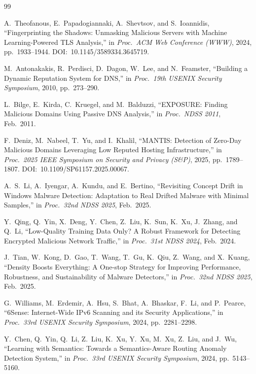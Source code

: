 \documentclass[12pt, a4paper, twoside]{report}
\begin{document}
\cleardoublepage
{}

\begin{thebibliography}{99}

A.~Theofanous, E.~Papadogiannaki, A.~Shevtsov, and S.~Ioannidis,
``Fingerprinting the Shadows: Unmasking Malicious Servers with Machine Learning-Powered TLS Analysis,''
in \textit{Proc.\ ACM Web Conference (WWW)}, 2024, pp.\ 1933--1944.
DOI:~10.1145/3589334.3645719.

M.~Antonakakis, R.~Perdisci, D.~Dagon, W.~Lee, and N.~Feamster,
``Building a Dynamic Reputation System for DNS,''
in \textit{Proc.\ 19th USENIX Security Symposium}, 2010, pp.\ 273--290.

L.~Bilge, E.~Kirda, C.~Kruegel, and M.~Balduzzi,
``EXPOSURE: Finding Malicious Domains Using Passive DNS Analysis,''
in \textit{Proc.\ NDSS 2011}, Feb.\ 2011.

F.~Deniz, M.~Nabeel, T.~Yu, and I.~Khalil,
``MANTIS: Detection of Zero-Day Malicious Domains Leveraging Low Reputed Hosting Infrastructure,''
in \textit{Proc.\ 2025 IEEE Symposium on Security and Privacy (S\&P)}, 2025, pp.\ 1789--1807.
DOI:~10.1109/SP61157.2025.00067.

A.~S.~Li, A.~Iyengar, A.~Kundu, and E.~Bertino,
``Revisiting Concept Drift in Windows Malware Detection: Adaptation to Real Drifted Malware with Minimal Samples,''
in \textit{Proc.\ 32nd NDSS 2025}, Feb.\ 2025.

Y.~Qing, Q.~Yin, X.~Deng, Y.~Chen, Z.~Liu, K.~Sun, K.~Xu, J.~Zhang, and Q.~Li,
``Low-Quality Training Data Only? A Robust Framework for Detecting Encrypted Malicious Network Traffic,''
in \textit{Proc.\ 31st NDSS 2024}, Feb.\ 2024.

J.~Tian, W.~Kong, D.~Gao, T.~Wang, T.~Gu, K.~Qiu, Z.~Wang, and X.~Kuang,
``Density Boosts Everything: A One-stop Strategy for Improving Performance, Robustness, and Sustainability of Malware Detectors,''
in \textit{Proc.\ 32nd NDSS 2025}, Feb.\ 2025.

G.~Williams, M.~Erdemir, A.~Hsu, S.~Bhat, A.~Bhaskar, F.~Li, and P.~Pearce,
``6Sense: Internet-Wide IPv6 Scanning and its Security Applications,''
in \textit{Proc.\ 33rd USENIX Security Symposium}, 2024, pp.\ 2281--2298.

Y.~Chen, Q.~Yin, Q.~Li, Z.~Liu, K.~Xu, Y.~Xu, M.~Xu, Z.~Liu, and J.~Wu,
``Learning with Semantics: Towards a Semantics-Aware Routing Anomaly Detection System,''
in \textit{Proc.\ 33rd USENIX Security Symposium}, 2024, pp.\ 5143--5160.


\end{thebibliography}
\end{document}

